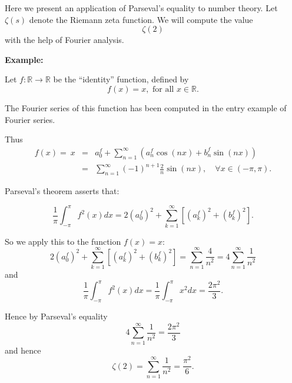 \documentclass[12pt]{article}
\newcommand{\Reals}{\mathbb{R}}
\begin{document}
Here we present an application of Parseval's equality to number
theory. Let $\zeta(s)$ denote the Riemann zeta function. We will
compute the value
$$\zeta(2)$$
with the help of Fourier analysis.

{\bf Example:}

Let $f\colon \Reals \to \Reals$ be the ``identity'' function,
defined by
$$f(x)=x, \text{ for all }x\in\Reals.$$

The Fourier series of this function has been computed in the entry
example of Fourier series.

Thus
\begin{eqnarray*}
 f(x)=\ x&=& a_0^f +
\sum_{n=1}^{\infty}(a_n^f\cos(nx)+b_n^f\sin(nx)) \\
&=& \sum_{n=1}^{\infty}(-1)^{n+1}\frac{2}{n} \sin(nx), \quad \forall x\in
(-\pi,\pi).
\end{eqnarray*}

Parseval's theorem asserts that:

$$\frac{1}{\pi}\int_{-\pi}^{\pi}f^2(x)dx = 2(a_0^f)^2 + \sum_{k=1}^{\infty}[(a_k^f)^2+(b_k^f)^2].$$

So we apply this to the function $f(x)= x $:
$$2(a_0^f)^2 +
\sum_{k=1}^{\infty}[(a_k^f)^2+(b_k^f)^2]= \sum_{n=1}^{\infty}
\frac{4}{n^2}= 4\sum_{n=1}^{\infty}\frac{1}{n^2}$$ and
$$\frac{1}{\pi}\int_{-\pi}^{\pi}f^2(x)dx = \frac{1}{\pi}\int_{-\pi}^{\pi}x^2dx= \frac{2\pi^2}{3}.$$

Hence by Parseval's equality
$$4\sum_{n=1}^{\infty}\frac{1}{n^2}=\frac{2\pi^2}{3}$$
and hence
$$\zeta(2)=\sum_{n=1}^{\infty}\frac{1}{n^2}=\frac{\pi^2}{6}.$$
\end{document}
